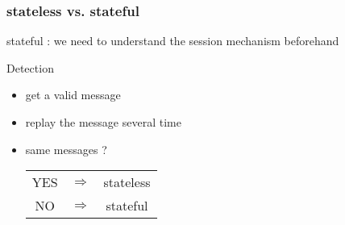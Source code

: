 \begin{frame}\frametitle{stateless vs. stateful}

  stateful : we need to understand the session mechanism beforehand

  \begin{block}{Detection}
    \begin{itemize}
      \item get a valid message
      \item replay the message several time
      \item same messages ? \begin{tabular}{ccc}YES &$\Rightarrow$& stateless\\NO &$\Rightarrow$& stateful\end{tabular}
    \end{itemize}
  \end{block}

\end{frame}

\begin{frame}
\end{frame}
